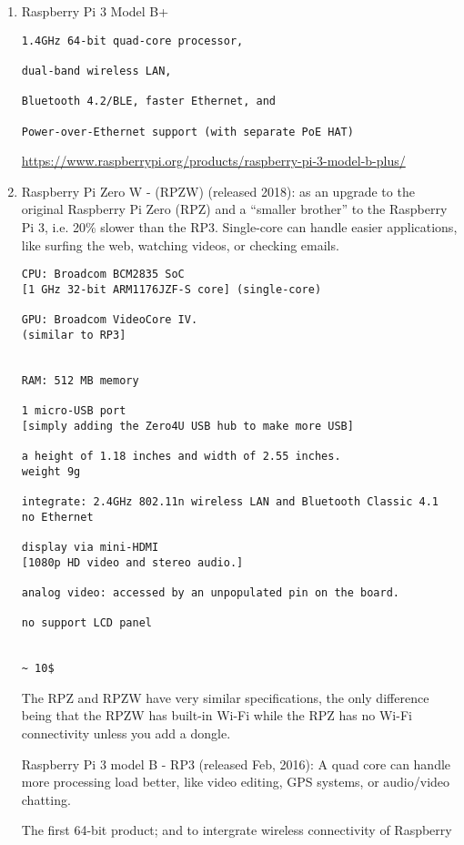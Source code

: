 \begin{enumerate}
  \item Raspberry Pi 3 Model B+
  
\begin{verbatim}
1.4GHz 64-bit quad-core processor, 

dual-band wireless LAN, 

Bluetooth 4.2/BLE, faster Ethernet, and 

Power-over-Ethernet support (with separate PoE HAT)
\end{verbatim}

\url{https://www.raspberrypi.org/products/raspberry-pi-3-model-b-plus/}


  \item Raspberry Pi Zero W - (RPZW) (released 2018): as an upgrade to the
  original Raspberry Pi Zero (RPZ) and a “smaller brother” to the Raspberry Pi
  3, i.e.
  20\% slower than the RP3. Single-core can handle easier applications, like
  surfing the web, watching videos, or checking emails.
  
\begin{verbatim}
CPU: Broadcom BCM2835 SoC 
[1 GHz 32-bit ARM1176JZF-S core] (single-core)

GPU: Broadcom VideoCore IV.
(similar to RP3]


RAM: 512 MB memory 

1 micro-USB port
[simply adding the Zero4U USB hub to make more USB]

a height of 1.18 inches and width of 2.55 inches. 
weight 9g

integrate: 2.4GHz 802.11n wireless LAN and Bluetooth Classic 4.1
no Ethernet

display via mini-HDMI
[1080p HD video and stereo audio.]

analog video: accessed by an unpopulated pin on the board.

no support LCD panel


~ 10$
\end{verbatim}

  The RPZ and RPZW have very similar specifications, the only difference being
  that the RPZW has built-in Wi-Fi while the RPZ has no Wi-Fi connectivity
  unless you add a dongle.
  
  \ite Raspberry Pi 3 model B - RP3 (released Feb, 2016): A quad core can handle more
  processing load better, like video editing, GPS systems, or audio/video
  chatting.
  
 The first 64-bit product; and to intergrate wireless connectivity of Raspberry


\end{enumerate}
